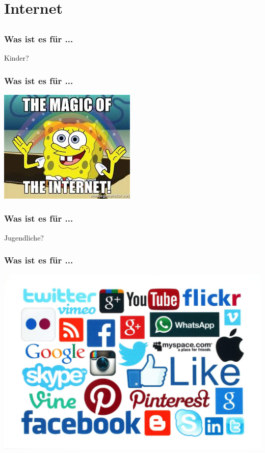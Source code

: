 \documentclass[12pt]{beamer}
\begin{document}
\section{Internet}
\subsection{}

\begin{center}
\begin{frame}
	\frametitle{Was ist es für ...}
	Kinder?
\end{frame}
\begin{frame}
	\frametitle{Was ist es für ...}
	\includegraphics[height=0.7\textheight]{img//magic_internet.jpg}
\end{frame}
\begin{frame}
	\frametitle{Was ist es für ...}
	Jugendliche?
\end{frame}
\begin{frame}
	\frametitle{Was ist es für ...}
	\includegraphics[height=0.7\textheight]{img//social_networks.jpg}
\end{frame}
\begin{frame}

\end{frame}
\end{center}
\end{document}
